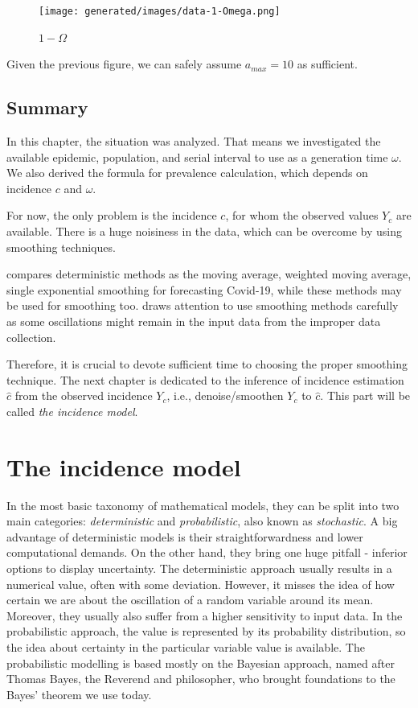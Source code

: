 \documentclass[
  digital, %
  oneside, %
  lof,     %
  lot,     %
]{fithesis4}
\begin{document}
\begin{figure}[H]
  \begin{center}
    \texttt{[image: generated/images/data-1-Omega.png]}
  \end{center}
  \caption{$1 - \Omega$}
  \label{fig:data-1-Omega}
\end{figure}

Given the previous figure, we can safely assume 
$a_{max} = 10$ as sufficient.

\section{Summary}

In this chapter, the situation was analyzed.
That means we investigated the available epidemic, population, and serial interval to use as a generation time $\omega$.
We also derived the formula for prevalence calculation, which depends on incidence $c$ and $\omega$.

For now, the only problem is the incidence $c$, for whom the observed values $Y_c$ are available.
There is a huge noisiness in the data, which can be overcome by using smoothing techniques.

\cite{elmousalami2020} compares deterministic methods as the moving average, weighted moving average, single exponential smoothing for forecasting Covid-19, while these methods may be used for smoothing too.
\cite{annunziato2020} draws attention to use smoothing methods carefully as some oscillations might remain in the input data from the improper data collection.

Therefore, it is crucial to devote sufficient time to choosing the proper smoothing technique.
The next chapter is dedicated to the inference of incidence estimation $\hat{c}$ from the observed incidence $Y_c$, i.e., denoise/smoothen $Y_c$ to $\hat{c}$. This part will be called \textit{the incidence model}.


\chapter{The incidence model}

In the most basic taxonomy of mathematical models, they can be split into two main categories: \textit{deterministic} and \textit{probabilistic}, also known as \textit{stochastic}. 
A big advantage of deterministic models is their straightforwardness and lower computational demands. 
On the other hand, they bring one huge pitfall - inferior options to display uncertainty.
The deterministic approach usually results in a numerical value, often with some deviation. However, it misses the idea of how certain we are about the oscillation of a random variable around its mean.
Moreover, they usually also suffer from a higher sensitivity to input data.
In the probabilistic approach, the value is represented by its probability distribution, so the idea about certainty in the particular variable value is available. 
The probabilistic modelling is based mostly on the Bayesian approach, named after Thomas Bayes, the Reverend and philosopher, who brought foundations to the Bayes' theorem we use today.
\end{document}
